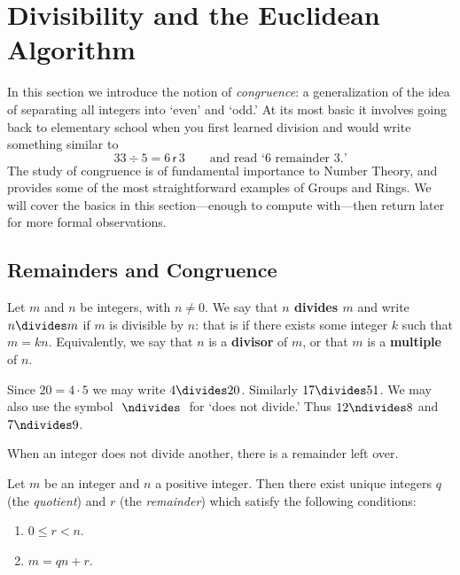 \section{Divisibility and the Euclidean Algorithm}\label{sec:gcd}

In this section we introduce the notion of \emph{congruence}: a generalization of the idea of separating all integers into `even' and `odd.' At its most basic it involves going back to elementary school when you first learned division and would write something similar to
\[33\div 5=6\mathsf{\,r\,}3\qquad\text{and read `6 remainder 3.'}\]
The study of congruence is of fundamental importance to Number Theory, and provides some of the most straightforward examples of Groups and Rings. We will cover the basics in this section---enough to compute with---then return later for more formal observations.

\subsection{Remainders and Congruence}\label{sec:cong}

\begin{defn}\label{defn:div}
Let $m$ and $n$ be integers, with $n\neq 0$. We say that \textbf{$n$ divides $m$} and write $n\divides m$ if $m$ is divisible by $n$: that is if there exists some integer $k$ such that $m=kn$. Equivalently, we say that $n$ is a \textbf{divisor} of $m$, or that $m$ is a \textbf{multiple} of $n$.
\end{defn}

\begin{exs}
Since $20=4\cdot 5$ we may write $4\divides 20$. Similarly $17\divides 51$. We may also use the symbol $\ \ndivides\ $ for `does not divide.' Thus $12\ndivides 8$ and $7\ndivides 9$.
\end{exs}

When an integer does not divide another, there is a remainder left over.

\begin{thm}\label{thm:div}
Let $m$ be an integer and $n$ a positive integer. Then there exist unique integers $q$ (the \emph{quotient}) and $r$ (the \emph{remainder}) which satisfy the following conditions:
\begin{enumerate}\setlength{\itemsep}{0pt}
  \item $0\le r<n$.
  \item $m=qn+r$.
\end{enumerate} 
\end{thm}

